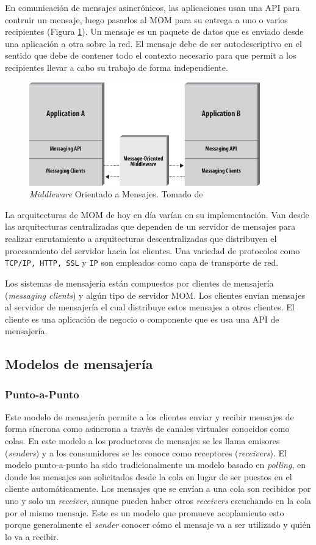 \documentclass[11pt, twoside]{report}
\begin{document}
En comunicación de mensajes asincrónicos, las aplicaciones usan una API para contruir un mensaje, luego pasarlos al MOM para su entrega a uno o varios recipientes (Figura \ref{fig:mom}). Un mensaje es un paquete de datos que es enviado desde una aplicación a otra sobre la red. El mensaje debe de ser autodescriptivo en el sentido que debe de contener todo el contexto necesario para que permit a los recipientes llevar a cabo su trabajo de forma independiente. 


\begin{figure}[h]
  \centering
  \includegraphics[width=10cm]{jms20-mom}
  \caption{\small{\emph{Middleware} Orientado a Mensajes. Tomado de \cite{jms20}}}
  \label{fig:mom}
\end{figure} 

La arquitecturas de MOM de hoy en día varían en su implementación. Van desde las arquitecturas centralizadas que dependen de un servidor de mensajes para realizar enrutamiento a arquitecturas descentralizadas que distribuyen el procesamiento del servidor hacia los clientes. Una variedad de protocolos como \texttt{TCP/IP, HTTP, SSL} y \texttt{IP} son empleados como capa de transporte de red.

Los sistemas de mensajería están compuestos por clientes de mensajería (\emph{messaging clients}) y algún tipo de servidor MOM. Los clientes envían mensajes al servidor de mensajería el cual distribuye estos mensajes a otros clientes. El cliente es una aplicación de negocio o componente que es usa una API de mensajería.

\subsection{Modelos de mensajería}

\subsubsection{Punto-a-Punto}
Este modelo de mensajería permite a los clientes enviar y recibir mensajes de forma síncrona como asíncrona a través de canales virtuales conocidos como colas. En este modelo a los productores de mensajes se les llama emisores (\emph{senders}) y a los consumidores se les conoce como receptores (\emph{receivers}). El modelo punto-a-punto ha sido tradicionalmente un modelo basado en \emph{polling}, en donde los mensajes son solicitados desde la cola en lugar de ser puestos en el cliente automáticamente. Los mensajes que se envían a una cola son recibidos por uno y solo un \emph{receiver}, aunque pueden haber otros \emph{receivers} escuchando en la cola por el mismo mensaje. Este es un modelo que promueve acoplamiento esto porque generalmente el \emph{sender} conocer cómo el mensaje va a ser utilizado y quién lo va a recibir. 
\end{document}
